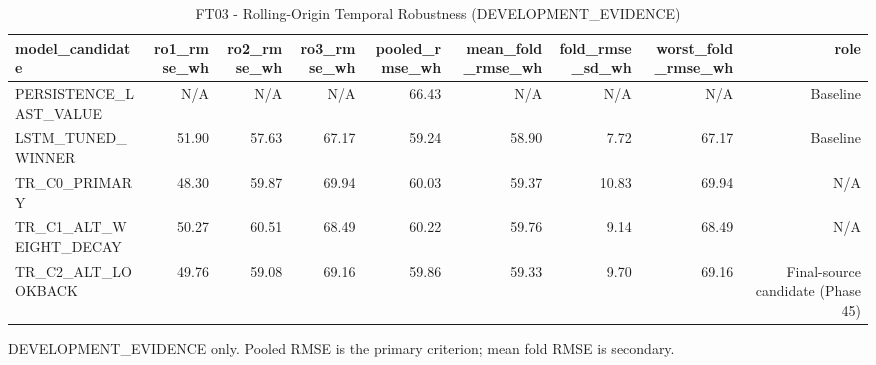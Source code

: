 \begin{table}[h!]
\centering
\caption{FT03 - Rolling-Origin Temporal Robustness (DEVELOPMENT\_EVIDENCE)}
\label{tab:ft03\_-\_rolling-origin\_temporal\_robustness\_(development\_evidence)}
\begin{tabular}{lrrrrrrrr}
\toprule
model\_candidate & ro1\_rmse\_wh & ro2\_rmse\_wh & ro3\_rmse\_wh & pooled\_rmse\_wh & mean\_fold\_rmse\_wh & fold\_rmse\_sd\_wh & worst\_fold\_rmse\_wh & role \\
\midrule
PERSISTENCE\_LAST\_VALUE & N/A & N/A & N/A & 66.43 & N/A & N/A & N/A & Baseline \\
LSTM\_TUNED\_WINNER & 51.90 & 57.63 & 67.17 & 59.24 & 58.90 & 7.72 & 67.17 & Baseline \\
TR\_C0\_PRIMARY & 48.30 & 59.87 & 69.94 & 60.03 & 59.37 & 10.83 & 69.94 & N/A \\
TR\_C1\_ALT\_WEIGHT\_DECAY & 50.27 & 60.51 & 68.49 & 60.22 & 59.76 & 9.14 & 68.49 & N/A \\
TR\_C2\_ALT\_LOOKBACK & 49.76 & 59.08 & 69.16 & 59.86 & 59.33 & 9.70 & 69.16 & Final-source candidate (Phase 45) \\
\bottomrule
\end{tabular}
\vspace{4pt}
\footnotesize{DEVELOPMENT\_EVIDENCE only. Pooled RMSE is the primary criterion; mean fold RMSE is secondary.}\\
\end{table}
